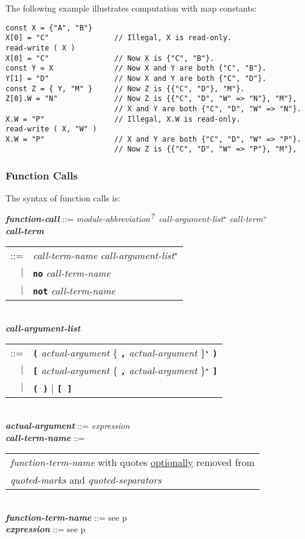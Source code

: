 \documentclass[12pt]{article}
\newcommand{\TT}[1]{{\tt \bfseries #1}}
\newcommand{\STAR}{{\Large $^\star$}}
\newcommand{\PLUS}[1][]{{$^{+#1}$}}
\newcommand{\QMARK}{{$^{\,\mbox{\footnotesize ?}}$}}
\newcommand{\ttkey}[1]{{\tt \bfseries #1}}
\newcommand{\emkey}[1]{{\em \bfseries #1}}
\newcommand{\pagref}[1]{p\pageref{#1}}
\newenvironment{indpar}[1][0.3in]%
	{\begin{list}{}%
		     {\setlength{\itemsep}{0in}%
		      \setlength{\topsep}{0in}%
		      \setlength{\parsep}{1ex}%
		      \setlength{\labelwidth}{#1}%
		      \setlength{\leftmargin}{#1}%
		      \addtolength{\leftmargin}{\labelsep}}%
	 \item}%
	{\end{list}}
\begin{document}
The following example illustrates
computation with map constants:
\begin{indpar}\begin{verbatim}
const X = {"A", "B"}
X[0] = "C"               // Illegal, X is read-only.
read-write ( X )
X[0] = "C"               // Now X is {"C", "B"}.
const Y = X              // Now X and Y are both {"C", "B"}. 
Y[1] = "D"               // Now X and Y are both {"C", "D"}. 
const Z = { Y, "M" }     // Now Z is {{"C", "D"}, "M"}.
Z[0].W = "N"             // Now Z is {{"C", "D", "W" => "N"}, "M"},
                         // X and Y are both {"C", "D", "W" => "N"}.
X.W = "P"                // Illegal, X.W is read-only.
read-write ( X, "W" )
X.W = "P"                // X and Y are both {"C", "D", "W" => "P"}.
                         // Now Z is {{"C", "D", "W" => "P"}, "M"},
\end{verbatim}\end{indpar}

\subsubsection{Function Calls}
\label{FUNCTION-CALLS}

The syntax of function calls is:

\begin{indpar}
\emkey{function-call}\label{FUNCTION-CALL}
    ::= {\em module-abbreviation}\QMARK{}
        {\em call-argument-list}\STAR{}
        {\em call-term}\PLUS{}
\\[0.5ex]
\emkey{call-term}
    \begin{tabular}[t]{rl}
    ::= & {\em call-term-name} {\em call-argument-list}\STAR{} \\
    $|$ & \ttkey{no} {\em call-term-name} \\
    $|$ & \ttkey{not} {\em call-term-name} \\
    \end{tabular}
\\[0.5ex]
\emkey{call-argument-list}\label{CALL-ARGUMENT-LIST}
    \begin{tabular}[t]{rl}
    ::= & \TT{(} {\em actual-argument}
          \{ \TT{,} {\em actual-argument} \}\STAR{} \TT{)} \\
    $|$ & \TT{[} {\em actual-argument}
          \{ \TT{,} {\em actual-argument} \}\STAR{} \TT{]} \\
    $|$ & \TT{(~)} $|$ \TT{[~]} \\
    \end{tabular}
\\[0.5ex]
\emkey{actual-argument} ::= {\em expression}
\\[0.5ex]
\emkey{call-term-name}\label{CALL-TERM-NAME} ::=
    \begin{tabular}[t]{@{}l}
    {\em function-term-name} with quotes \underline{optionally} removed from \\
    {\em quoted-marks} and {\em quoted-separators}
    \end{tabular}
\\[0.5ex]
\emkey{function-term-name} ::= see \pagref{FUNCTION-TERM-NAME}
\\[0.5ex]
\emkey{expression} ::= see \pagref{EXPRESSION}
\end{indpar}
\end{document}
